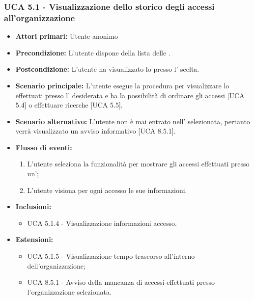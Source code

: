 \subsubsection{UCA 5.1 - Visualizzazione dello storico degli accessi all'organizzazione}
\begin{itemize}
    \item \textbf{Attori primari:} Utente anonimo
    \item \textbf{Precondizione:} L'utente dispone della lista delle .
    \item \textbf{Postcondizione:} L'utente ha visualizzato lo  presso l' scelta.
    \item \textbf{Scenario principale:} L'utente esegue la procedura per visualizzare lo  effettuati presso l' desiderata e ha la possibilità di ordinare gli accessi [UCA 5.4] o effettuare ricerche [UCA 5.5].
    \item \textbf{Scenario alternativo:} L'utente non è mai entrato nell' selezionata, pertanto verrà visualizzato un avviso informativo [UCA 8.5.1].
    \item \textbf{Flusso di eventi:}
    \begin{enumerate}
        \item L'utente seleziona la funzionalità per mostrare gli accessi effettuati presso un';
        \item L'utente visiona per ogni accesso le sue informazioni.
    \end{enumerate}
    \item \textbf{Inclusioni:}
    \begin{itemize}
        \item UCA 5.1.4 - Visualizzazione informazioni accesso.
    \end{itemize}
    \item \textbf{Estensioni:}
    \begin{itemize}
        \item UCA 5.1.5 - Visualizzazione tempo trascorso all'interno dell'organizzazione;
        \item UCA 8.5.1 - Avviso della mancanza di accessi effettuati presso l'organizzazione selezionata.
    \end{itemize}
\end{itemize}

